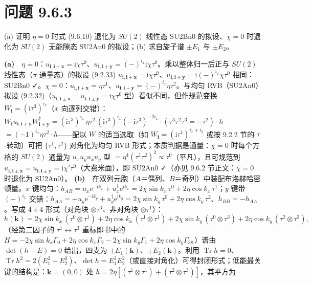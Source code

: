 \section*{问题 9.6.3}
\begin{problem}
(a) 证明 $\eta=0$ 时式 (9.6.10) 退化为 $SU(2)$ 线性态 SU2Bn0 的拟设、$\chi=0$ 时退化为 $SU(2)$ 无能隙态 SU2An0 的拟设；(b) 求自旋子谱 $\pm E_1$ 与 $\pm E_2$。
\end{problem}
\solution
\textbf{(a)}　$\eta=0$：$u_{\pmb{i},\pmb{i}+\pmb{x}}=\mathrm{i}\chi\tau^0$、$u_{\pmb{i},\pmb{i}+\pmb{y}}=(-)^{i_x}\mathrm{i}\chi\tau^0$。乘以整体归一后正与 $SU(2)$ 线性态（$\pi$ 通量态）的拟设 (9.2.33) $u_{\pmb{i},\pmb{i}+\pmb{x}}=\mathrm{i}\chi\tau^0$、$u_{\pmb{i},\pmb{i}+\pmb{y}}=\mathrm{i}(-)^{i_x}\chi\tau^0$ 相同：SU2Bn0 ✓。$\chi=0$：$u_{\pmb{i},\pmb{i}+\pmb{x}}=\eta\tau^1$、$u_{\pmb{i},\pmb{i}+\pmb{y}}=(-)^{i_x}\eta\tau^2$。与均匀 RVB（SU2An0）拟设 (9.2.32)（$u_{\pmb{i},\pmb{i}\pm\pmb{x}}=u_{\pmb{i},\pmb{i}\pm\pmb{y}}=\mathrm{i}\chi\tau^0$ 型）看似不同，但作规范变换 $W_{\pmb{i}}=(\mathrm{i}\tau^3)^{i_x}$（$x$ 向逐列交错）：$W_{\pmb{i}}u_{\pmb{i},\pmb{i}+\pmb{y}}W^{\dagger}_{\pmb{i}+\pmb{y}}=(\mathrm{i}\tau^3)^{i_x}\,\eta\tau^2\,(\mathrm{i}\tau^3)^{i_x}(-\mathrm{i}\tau^3)^{-2i_x}\cdot(\tau^3\tau^2\tau^3=-\tau^2)\cdot h$
$=(-1)^{i_x}\eta\tau^2\cdot h$——配以 $W$ 的适当选取（如 $W_{\pmb{i}}=(\mathrm{i}\tau^1)^{i_x+i_y}$ 或按 9.2.2 节的 $\tau$-转动）可把 $\{\tau^1,\tau^2\}$ 对角化为均匀 RVB 形式；本质判据是通量：$\chi=0$ 时每个方格的 $SU(2)$ 通量为 $u_xu_yu_xu_y$ 型 $=\eta^4(\tau^1\tau^2)^2\propto\tau^0$（平凡），且可规范到 $u_{\pmb{i},\pmb{i}\pm\pmb{x}}=u_{\pmb{i},\pmb{i}\pm\pmb{y}}=\mathrm{i}\chi'\tau^0$（大费米面），即 SU2An0 ✓（亦见 9.6.2 节正文：$\chi=0$ 时退化为 SU2An0）。
\textbf{(b)}　在双列元胞（$A$＝偶列、$B$＝奇列）中装配布洛赫哈密顿量。$x$ 键均匀：$h_{AB}=u_x\mathrm{e}^{-\mathrm{i}k_x}+u_x^{\dagger}\mathrm{e}^{\mathrm{i}k_x}=2\chi\sin k_x\,\tau^0+2\eta\cos k_x\,\tau^1$；$y$ 键带 $(-)^{i_x}$ 交错：$h_{AA}=+u_y\mathrm{e}^{-\mathrm{i}k_y}+u_y^{\dagger}\mathrm{e}^{\mathrm{i}k_y}=2\chi\sin k_y\,\tau^0+2\eta\cos k_y\,\tau^2$、$h_{BB}=-h_{AA}$。写成 $4\times4$ 形式（对角块 $\otimes\tau^3$、非对角块 $\otimes\tau^1$）：
\begin{equation*}
h(\pmb{k})=2\chi\sin k_x\,(\tau^{0}\otimes\tau^{1})+2\eta\cos k_x\,(\tau^{1}\otimes\tau^{1})+2\chi\sin k_y\,(\tau^{0}\otimes\tau^{3})+2\eta\cos k_y\,(\tau^{2}\otimes\tau^{3}) ,
\end{equation*}
（经第二因子的 $\tau^{1}\leftrightarrow\tau^{3}$ 重标即书中的 $H=-2\chi\sin k_x\Gamma_0+2\eta\cos k_x\Gamma_2-2\chi\sin k_y\Gamma_1+2\eta\cos k_y\Gamma_3$。）谱由 $\det(h-E)=0$ 给出，四支为 $\pm E_1(\pmb{k})$、$\pm E_2(\pmb{k})$。利用 $\operatorname{Tr}h=0$、$\operatorname{Tr}h^{2}=2(E_1^{2}+E_2^{2})$、$\det h=E_1^{2}E_2^{2}$（或直接对角化）可得封闭形式；低能最关键的结构是：$\pmb{k}=(0,0)$ 处 $h=2\eta[(\tau^{1}\otimes\tau^{1})+(\tau^{2}\otimes\tau^{3})]$，其平方为
